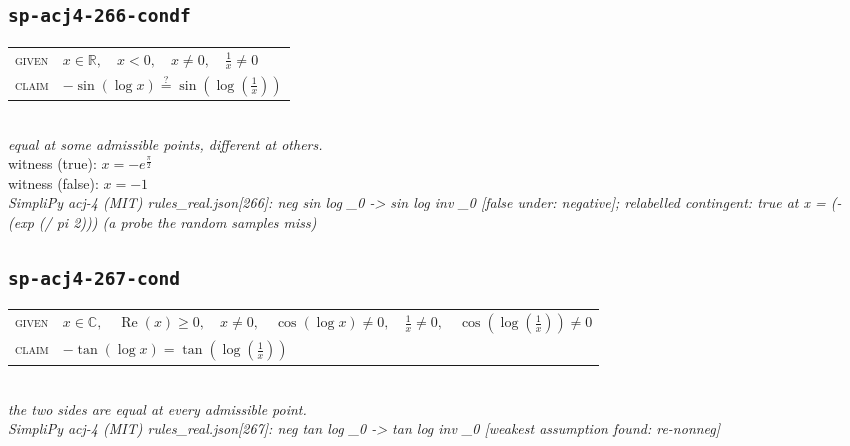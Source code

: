 \documentclass[11pt]{article}
\begin{document}
\subsection*{\texttt{sp-acj4-266-condf}}
\begin{tabular}{@{}l@{\quad}l@{}}
\textsc{given} & $x \in \mathbb{R},\quad x < 0,\quad x \neq 0,\quad \frac{1}{x} \neq 0$ \\[4pt]
\textsc{claim} & $\displaystyle -\sin\left(\log x\right) \overset{?}{=} \sin\left(\log\left(\frac{1}{x}\right)\right)$ \\
\end{tabular}\\[2pt]
{\small\emph{equal at some admissible points, different at others.}}\\
{\footnotesize\color{gray}witness (true): $x = -e^{\frac{\pi}{2}}$}\\
{\footnotesize\color{gray}witness (false): $x = -1$}\\
\emph{SimpliPy acj-4 (MIT) rules\_real.json[266]: neg sin log \_0  ->  sin log inv \_0  [false under: negative]; relabelled contingent: true at x = (- (exp (/ pi 2))) (a probe the random samples miss)}\\

\subsection*{\texttt{sp-acj4-267-cond}}
\begin{tabular}{@{}l@{\quad}l@{}}
\textsc{given} & $x \in \mathbb{C},\quad \operatorname{Re}\left(x\right) \ge 0,\quad x \neq 0,\quad \cos\left(\log x\right) \neq 0,\quad \frac{1}{x} \neq 0,\quad \cos\left(\log\left(\frac{1}{x}\right)\right) \neq 0$ \\[4pt]
\textsc{claim} & $\displaystyle -\tan\left(\log x\right) = \tan\left(\log\left(\frac{1}{x}\right)\right)$ \\
\end{tabular}\\[2pt]
{\small\emph{the two sides are equal at every admissible point.}}\\
\emph{SimpliPy acj-4 (MIT) rules\_real.json[267]: neg tan log \_0  ->  tan log inv \_0  [weakest assumption found: re-nonneg]}\\
\end{document}
